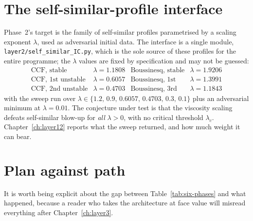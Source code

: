 \section{The self-similar-profile interface}
\label{sec:lambda-sweep-plan}

Phase~2's target is the family of self-similar profiles parametrised by a
scaling exponent \(\lambda\), used as adversarial initial data. The interface
is a single module, \texttt{layer2/self\_similar\_IC.py}, which is the sole
source of these profiles for the entire programme; the \(\lambda\) values are
fixed by specification and may not be guessed:
\[
  \begin{array}{llll}
    \text{CCF, stable} & \lambda=1.1808 &
    \text{Boussinesq, stable} & \lambda=1.9206 \\
    \text{CCF, 1st unstable} & \lambda=0.6057 &
    \text{Boussinesq, 1st} & \lambda=1.3991 \\
    \text{CCF, 2nd unstable} & \lambda=0.4703 &
    \text{Boussinesq, 3rd} & \lambda=1.1843
  \end{array}
\]
with the sweep run over \(\lambda\in\{1.2,\,0.9,\,0.6057,\,0.4703,\,0.3,\,0.1\}\)
plus an adversarial minimum at \(\lambda=0.01\). The conjecture under test is
that the viscosity scaling defeats self-similar blow-up for \emph{all}
\(\lambda>0\), with no critical threshold \(\lambda_c\).
Chapter~\ref{ch:layer12} reports what the sweep returned, and how much weight
it can bear.

\section{Plan against path}
\label{sec:plan-vs-path}

It is worth being explicit about the gap between
Table~\ref{tab:six-phases} and what happened, because a reader who takes the
architecture at face value will misread everything after
Chapter~\ref{ch:layer3}.


